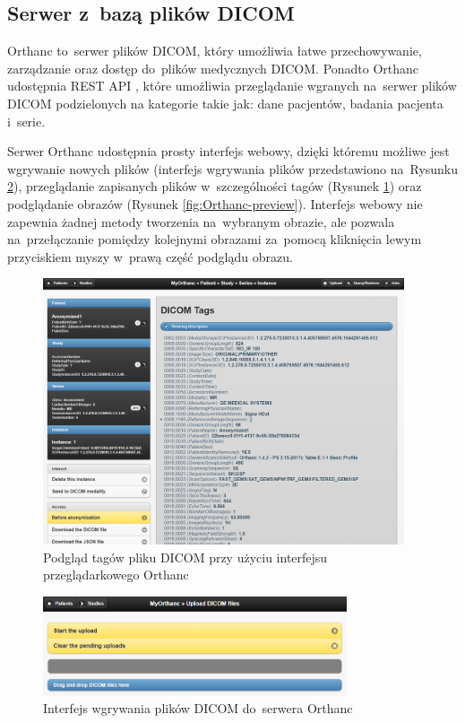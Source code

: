 \documentclass[a4paper,11pt,twoside,openright]{report}
\theoremstyle{definition}
\begin{document}
\subsection {Serwer z~bazą plików DICOM}

Orthanc \cite{Orthanc} to~serwer plików DICOM, który umożliwia łatwe przechowywanie,
zarządzanie oraz dostęp do~plików medycznych DICOM. Ponadto Orthanc udostępnia
REST API \cite{Orthanc API}, które umożliwia przeglądanie wgranych na~serwer plików DICOM podzielonych
na kategorie takie jak: dane pacjentów, badania pacjenta i~serie.

Serwer Orthanc udostępnia prosty interfejs webowy, dzięki któremu możliwe jest
wgrywanie nowych plików (interfejs wgrywania plików przedstawiono na~Rysunku
\ref{fig:Orthanc-upload}), przeglądanie zapisanych plików w~szczególności
tagów (Rysunek \ref{fig:Orthanc-tags}) oraz podglądanie obrazów (Rysunek \ref{fig:Orthanc-preview}).
Interfejs webowy nie zapewnia żadnej metody tworzenia na~wybranym obrazie, ale
pozwala na~przełączanie pomiędzy kolejnymi obrazami za~pomocą kliknięcia lewym
przyciskiem myszy w~prawą część podglądu obrazu.

\begin{figure}[tb!]
	\center
	\includegraphics[width=0.95\textwidth]{Orthanc-tags}
	\caption{Podgląd tagów pliku DICOM przy użyciu interfejsu przeglądarkowego Orthanc}
    	\label{fig:Orthanc-tags}
\end{figure}

\begin{figure}[tb!]
	\center
	\includegraphics[width=0.8\textwidth]{Orthanc-upload}
	\caption{Interfejs wgrywania plików DICOM do~serwera Orthanc \cite{Orthanc}}
    	\label{fig:Orthanc-upload}
\end{figure}
\end{document}
